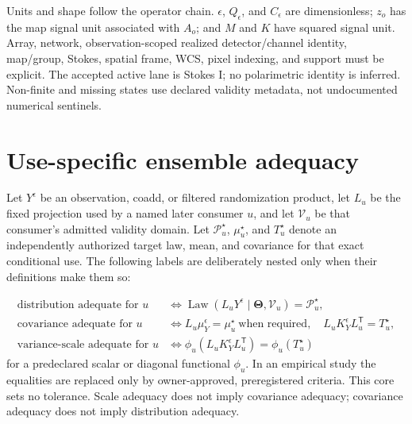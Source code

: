 \documentclass[11pt]{article}
\newcommand{\Law}{\operatorname{Law}}
\newcommand{\ThetaV}{\boldsymbol{\Theta}}
\begin{document}
Units and shape follow the operator chain.  $\epsilon$, $Q_\epsilon$, and
$C_\epsilon$ are dimensionless; $z_o$ has the map signal unit associated with
$A_o$; and $M$ and $K$ have squared signal unit.  Array, network,
observation-scoped realized detector/channel identity, map/group, Stokes,
spatial frame, WCS, pixel indexing, and support must be
explicit.  The accepted active lane is Stokes I; no polarimetric identity is
inferred.  Non-finite and missing states use declared validity metadata, not
undocumented numerical sentinels.

\section{Use-specific ensemble adequacy}

Let $Y^\epsilon$ be an observation, coadd, or filtered randomization product,
let $L_u$ be the fixed projection used by a named later consumer $u$, and let
$\mathcal V_u$ be that consumer's admitted validity domain.  Let
$\mathcal P_u^\star$, $\mu_u^\star$, and $T_u^\star$ denote an independently
authorized target law, mean, and covariance for that exact conditional use.
The following labels are deliberately nested only when their definitions make
them so:

\begin{align}
\text{distribution adequate for }u
&\iff
\Law(L_uY^\epsilon\mid\ThetaV,\mathcal V_u)
  =\mathcal P_u^\star,
\label{eq:distribution-adequacy}\\
\text{covariance adequate for }u
&\iff
L_u\mu_Y^\epsilon=\mu_u^\star\ \text{when required},\quad
L_uK_Y^\epsilon L_u^{\mathsf T}=T_u^\star,
\label{eq:covariance-adequacy}\\
\text{variance-scale adequate for }u
&\iff
\phi_u(L_uK_Y^\epsilon L_u^{\mathsf T})
=\phi_u(T_u^\star)
\label{eq:scale-adequacy}
\end{align}
for a predeclared scalar or diagonal functional $\phi_u$.  In an empirical
study the equalities are replaced only by owner-approved, preregistered
criteria.  This core sets no tolerance.  Scale adequacy does not imply
covariance adequacy; covariance adequacy does not imply distribution adequacy.
\end{document}
